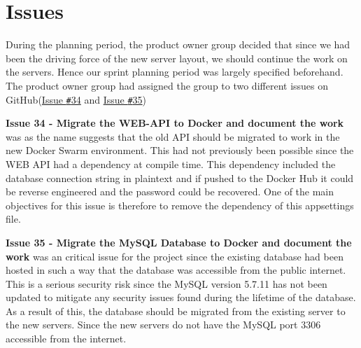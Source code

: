 \section{Issues}\label{SEC:Sprint3Issues}
During the planning period, the product owner group decided that since we had been the driving force of the new server layout, we should continue the work on the servers.
Hence our sprint planning period was largely specified beforehand.
The product owner group had assigned the group to two different issues on GitHub(\href{https://github.com/aau-giraf/wiki/issues/34}{Issue \texttt{\#}34} and \href{https://github.com/aau-giraf/wiki/issues/35}{Issue \texttt{\#}35})

\textbf{Issue 34 - Migrate the WEB-API to Docker and document the work} was as the name suggests that the old API should be migrated to work in the new Docker Swarm environment.
This had not previously been possible since the WEB API had a dependency at compile time.
This dependency included the database connection string in plaintext and if pushed to the Docker Hub it could be reverse engineered and the password could be recovered.
One of the main objectives for this issue is therefore to remove the dependency of this appsettings file.

\textbf{Issue 35 - Migrate the MySQL Database to Docker and document the work} was an critical issue for the project since the existing database had been hosted in such a way that the database was accessible from the public internet.
This is a serious security risk since the MySQL version 5.7.11 has not been updated to mitigate any security issues found during the lifetime of the database.
As a result of this, the database should be migrated from the existing server to the new servers.
Since the new servers do not have the MySQL port $3306$ accessible from the internet.
